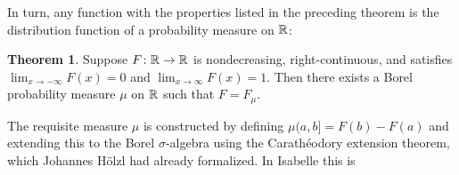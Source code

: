 \documentclass{article}
\theoremstyle{definition}
\newtheorem{theorem}{Theorem}[section]
\begin{document}
In turn, any function with the properties listed in the preceding theorem is the distribution function of a probability measure on $\mathbb{R}$:

\begin{theorem}
Suppose $F\colon \mathbb{R} \rightarrow \mathbb{R}$ is nondecreasing, right-continuous, and satisfies $\lim_{x \rightarrow -\infty} F(x) = 0$ and $\lim_{x \rightarrow \infty} F(x) = 1$. Then there exists a Borel probability measure $\mu$ on $\mathbb{R}$ such that $F = F_\mu$.
\end{theorem}

The requisite measure $\mu$ is constructed by defining $\mu (a,b] = F(b) - F(a)$ and extending this to the Borel $\sigma$-algebra using the Carath\'eodory extension theorem, which Johannes H\"olzl had already formalized. In Isabelle this is

\medskip
\end{document}
